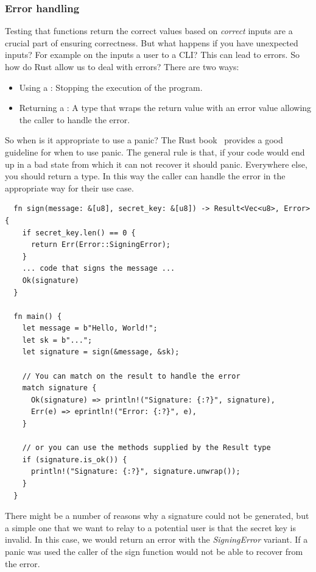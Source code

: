 \documentclass[11pt]{report}
\theoremstyle{definition}
\theoremstyle{plain}
\begin{document}
\subsubsection{Error handling}\label{sub:rusterror} %
Testing that functions return the correct values based on \textit{correct} inputs are a crucial part of ensuring correctness. But what happens if you have unexpected inputs? For example on the inputs a user to a CLI\@? This can lead to errors. So how do Rust allow us to deal with errors? There are two ways:
\begin{itemize}
  \item Using a : Stopping the execution of the program.
  \item Returning a : A type that wraps the return value with an error value allowing the caller to handle the error.
\end{itemize}
So when is it appropriate to use a panic? The Rust book~\cite[ch.9.3]{rustlangRustProgramming} provides a good guideline for when to use panic.
The general rule is that, if your code would end up in a bad state from which it can not recover it should panic. Everywhere else, you should return a  type. In this way the caller can handle the error in the appropriate way for their use case.
\begin{verbatim}
  fn sign(message: &[u8], secret_key: &[u8]) -> Result<Vec<u8>, Error> {
    if secret_key.len() == 0 {
      return Err(Error::SigningError);
    }
    ... code that signs the message ...
    Ok(signature)
  }

  fn main() {
    let message = b"Hello, World!";
    let sk = b"...";
    let signature = sign(&message, &sk);

    // You can match on the result to handle the error
    match signature {
      Ok(signature) => println!("Signature: {:?}", signature),
      Err(e) => eprintln!("Error: {:?}", e),
    }

    // or you can use the methods supplied by the Result type
    if (signature.is_ok()) {
      println!("Signature: {:?}", signature.unwrap());
    } 
  }
\end{verbatim}
There might be a number of reasons why a signature could not be generated, but a simple one that we want to relay to a potential user is that the secret key is invalid. In this case, we would return an error with the \textit{SigningError} variant. If a panic was used the caller of the sign function would not be able to recover from the error.
\end{document}
